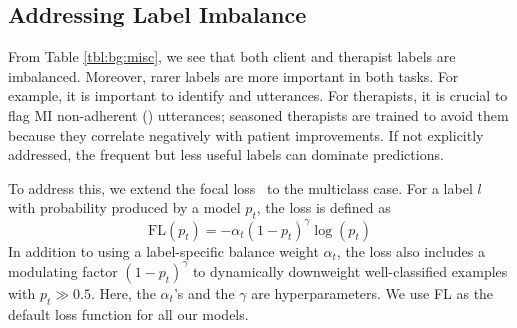 \subsection{Addressing Label Imbalance}
\label{ssec:focal_loss}
From Table \ref{tbl:bg:misc}, we see that both client and therapist
labels are imbalanced. Moreover, rarer labels are more important in
both tasks. For example, it is important to identify \CHANGE and
\SUSTAIN utterances. For therapists, it is crucial to flag MI
non-adherent (\MIN) utterances; seasoned therapists are trained to
avoid them because they correlate negatively with patient
improvements. If not explicitly addressed, the frequent but less
useful labels can dominate predictions.


To address this, we extend the focal loss~\cite[FL][]{lin2017focal}
to the multiclass case. For a label $l$ with probability produced by
a model $p_t$, the loss is defined as 
\begin{equation}
 \label{eq:focal}
\text{FL}(p_{t}) = -\alpha_{t} {(1 -p_{t})}^{\gamma} \log(p_{t})
\end{equation}
In addition to using a label-specific balance weight $\alpha_t$, the
loss also includes a modulating factor ${(1-p_{t})}^{\gamma}$ to
dynamically downweight well-classified examples with
$p_{t}\gg0.5$. Here, the $\alpha_t$'s and the $\gamma$ are
hyperparameters. We use FL as the default loss function for all our
models.

